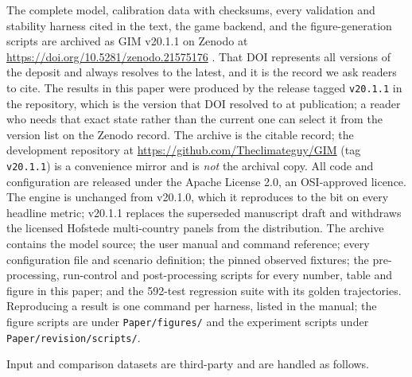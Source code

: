 \documentclass[12pt,a4paper]{article}
\newcommand{\Version}{v20.1.1}
\newcommand{\nTests}{592} \newcommand{\nSubtests}{657}
\begin{document}
The complete model, calibration data with checksums, every validation and stability harness
cited in the text, the game backend, and the figure-generation scripts are archived as GIM
\Version{} on Zenodo at \url{https://doi.org/10.5281/zenodo.21575176}
\citep{theclimateguy2026gim}. That DOI represents all versions of the deposit and always
resolves to the latest, and it is the record we ask readers to cite. The results in this paper
were produced by the release tagged \texttt{\Version} in the repository, which is the version
that DOI resolved to at publication; a reader who needs that exact state rather than the
current one can select it from the version list on the Zenodo record. The archive is the
citable record; the development repository at
\url{https://github.com/Theclimateguy/GIM} (tag \texttt{\Version}) is a convenience mirror and
is \emph{not} the archival copy. All code and configuration are released under the Apache
License 2.0, an OSI-approved licence. The engine is unchanged from v20.1.0, which it reproduces to the bit on every headline
metric; v20.1.1 replaces the superseded manuscript draft and withdraws the licensed Hofstede
multi-country panels from the distribution. The archive contains the model source; the user manual
and command reference; every configuration file and scenario definition; the pinned observed
fixtures; the pre-processing, run-control and post-processing scripts for every number, table
and figure in this paper; and the \nTests-test regression suite with its golden trajectories.
Reproducing a result is one command per harness, listed in the manual; the figure scripts are
under \texttt{Paper/figures/} and the experiment scripts under \texttt{Paper/revision/scripts/}.

Input and comparison datasets are third-party and are handled as follows.
\end{document}
